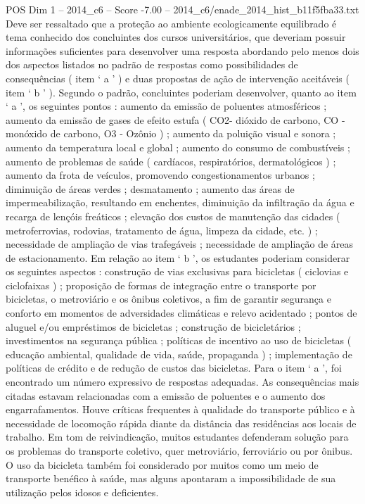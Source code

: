 \begin{textsample}{POS Dim 1 – 2014\_c6 – Score -7.00 – 2014\_c6/enade\_2014\_hist\_b11f5fba33.txt}
Deve ser ressaltado que a proteção ao ambiente ecologicamente equilibrado é tema conhecido dos concluintes dos cursos universitários, que deveriam possuir informações suficientes para desenvolver uma resposta abordando pelo menos dois dos aspectos listados no padrão de respostas como possibilidades de consequências ( item ‘ a ’ ) e duas propostas de ação de intervenção aceitáveis ( item ‘ b ’ ).
Segundo o padrão, concluintes poderiam desenvolver, quanto ao item ‘ a ’, os seguintes pontos : aumento da emissão de poluentes atmosféricos ; aumento da emissão de gases de efeito estufa ( CO2- dióxido de carbono, CO - monóxido de carbono, O3 - Ozônio ) ; aumento da poluição visual e sonora ; aumento da temperatura local e global ; aumento do consumo de combustíveis ; aumento de problemas de saúde ( cardíacos, respiratórios, dermatológicos ) ; aumento da frota de veículos, promovendo congestionamentos urbanos ; diminuição de áreas verdes ; desmatamento ; aumento das áreas de impermeabilização, resultando em enchentes, diminuição da infiltração da água e recarga de lençóis freáticos ; elevação dos custos de manutenção das cidades ( metroferrovias, rodovias, tratamento de água, limpeza da cidade, etc. ) ; necessidade de ampliação de vias trafegáveis ; necessidade de ampliação de áreas de estacionamento.
Em relação ao item ‘ b ’, os estudantes poderiam considerar os seguintes aspectos : construção de vias exclusivas para bicicletas ( ciclovias e ciclofaixas ) ; proposição de formas de integração entre o transporte por bicicletas, o metroviário e os ônibus coletivos, a fim de garantir segurança e conforto em momentos de adversidades climáticas e relevo acidentado ; pontos de aluguel e/ou empréstimos de bicicletas ; construção de bicicletários ; investimentos na segurança pública ; políticas de incentivo ao uso de bicicletas ( educação ambiental, qualidade de vida, saúde, propaganda ) ; implementação de políticas de crédito e de redução de custos das bicicletas.
Para o item ‘ a ’, foi encontrado um número expressivo de respostas adequadas.
As consequências mais citadas estavam relacionadas com a emissão de poluentes e o aumento dos engarrafamentos.
Houve críticas frequentes à qualidade do transporte público e à necessidade de locomoção rápida diante da distância das residências aos locais de trabalho.
Em tom de reivindicação, muitos estudantes defenderam solução para os problemas do transporte coletivo, quer metroviário, ferroviário ou por ônibus.
O uso da bicicleta também foi considerado por muitos como um meio de transporte benéfico à saúde, mas alguns apontaram a impossibilidade de sua utilização pelos idosos e deficientes.

\end{textsample}
